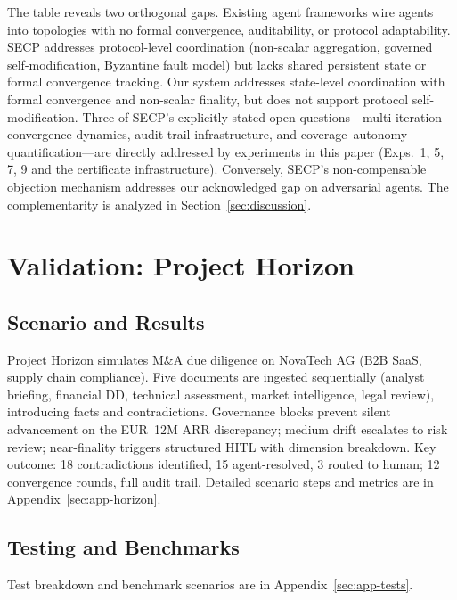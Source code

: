 \documentclass[11pt]{article}
\begin{document}
The table reveals two orthogonal gaps. Existing agent frameworks wire agents into topologies with no formal convergence, auditability, or protocol adaptability. SECP addresses protocol-level coordination (non-scalar aggregation, governed self-modification, Byzantine fault model) but lacks shared persistent state or formal convergence tracking. Our system addresses state-level coordination with formal convergence and non-scalar finality, but does not support protocol self-modification. Three of SECP's explicitly stated open questions---multi-iteration convergence dynamics, audit trail infrastructure, and coverage--autonomy quantification---are directly addressed by experiments in this paper (Exps.~1, 5, 7, 9 and the certificate infrastructure). Conversely, SECP's non-compensable objection mechanism addresses our acknowledged gap on adversarial agents. The complementarity is analyzed in Section~\ref{sec:discussion}.

\section{Validation: Project Horizon}

\subsection{Scenario and Results}

Project Horizon simulates M\&A due diligence on NovaTech AG (B2B SaaS, supply chain compliance). Five documents are ingested sequentially (analyst briefing, financial DD, technical assessment, market intelligence, legal review), introducing facts and contradictions. Governance blocks prevent silent advancement on the EUR~12M ARR discrepancy; medium drift escalates to risk review; near-finality triggers structured HITL with dimension breakdown. Key outcome: 18 contradictions identified, 15 agent-resolved, 3 routed to human; 12 convergence rounds, full audit trail. Detailed scenario steps and metrics are in Appendix~\ref{sec:app-horizon}.

\subsection{Testing and Benchmarks}

Test breakdown and benchmark scenarios are in Appendix~\ref{sec:app-tests}.
\end{document}
